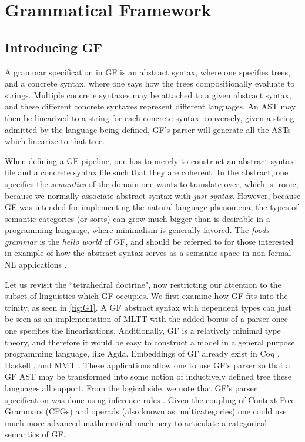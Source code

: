 \section{Grammatical Framework}

\subsection{Introducing GF}

A grammar specification in GF is an abstract syntax, where one specifies trees,
and a concrete syntax, where one says how the trees compositionally evaluate to
strings. Multiple concrete syntaxes may be attached to a given abstract syntax,
and these different concrete syntaxes represent different languages. An AST may
then be linearized to a string for each concrete syntax. conversely, given a
string admitted by the language being defined, GF's parser will generate all the
ASTs which linearize to that tree.

When defining a GF pipeline, one has to merely to construct an abstract syntax
file and a concrete syntax file such that they are coherent. In the abstract,
one specifies the \emph{semantics} of the domain one wants to translate over,
which is ironic, because we normally associate abstract syntax with \emph{just
syntax}. However, because GF was intended for implementing the natural language
phenomena, the types of semantic categories (or sorts) can grow much bigger than
is desirable in a programming language, where minimalism is generally favored.
The \emph{foods grammar} is the \emph{hello world} of GF, and should be referred
to for those interested in example of how the abstract syntax serves as a
semantic space in non-formal NL applications \cite{ranta2011grammatical}.

Let us revisit the ``tetrahedral doctrine", now restricting our attention to the
subset of linguistics which GF occupies. We first examine how GF fits into the
trinity, as seen in \autoref{fig:G1}. A GF abstract syntax with dependent types
can just be seen as an implementation of MLTT with the added bonus of a parser
once one specifies the linearizations. Additionally, GF is a relatively minimal
type theory, and therefore it would be easy to construct a model in a general
purpose programming language, like Agda. Embeddings of GF already exist in Coq
\cite{bernardy-chatzikyriakidis-2017-type}, Haskell \cite{angelov2010pgf}, and
MMT \cite{Kohlhase_2019}. These applications allow one to use GF's parser so
that a GF AST may be transformed into some notion of inductively defined tree
these languages all support. From the logical side, we note that GF's parser
specification was done using inference rules \cite{angelov2010phd}. Given the
coupling of Context-Free Grammars (CFGs) and operads (also known as
multicategories) \cite{lambek1989multicategories} \cite{705656} one could use
much more advanced mathematical machinery to articulate a categorical semantics
of GF.


